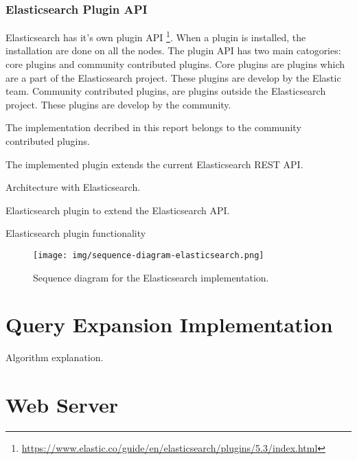 \subsubsection{Elasticsearch Plugin API}
Elasticsearch has it's own plugin API \footnote{\url{https://www.elastic.co/guide/en/elasticsearch/plugins/5.3/index.html}}.
When a plugin is installed, the installation are done on all the nodes.
The plugin API has two main catogories: core plugins and community contributed plugins.
Core plugins are plugins which are a part of the Elasticsearch project.
These plugins are develop by the Elastic team.
Community contributed plugins, are plugins outside the Elasticsearch project.
These plugins are develop by the community.

The implementation decribed in this report belongs to the community contributed plugins.

The implemented plugin extends the current Elasticsearch REST API.

Architecture with Elasticsearch.

Elasticsearch plugin to extend the Elasticsearch API.

Elasticsearch plugin functionality

\begin{figure}[h!]
\centering \texttt{[image: img/sequence-diagram-elasticsearch.png]}
\caption{Sequence diagram for the Elasticsearch implementation.}
\label{fig:sequence-diagram-lucene}
\end{figure}

\section{Query Expansion Implementation}
Algorithm explanation.

\section{Web Server}
